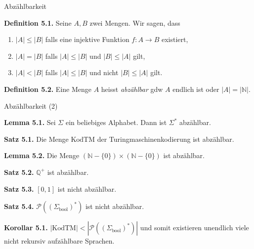 \documentclass[11pt,aspectratio=169]{beamer}
\begin{document}
\begin{frame}{Abzählbarkeit}

    \textbf{Definition 5.1.}
    Seine \(A, B\) zwei Mengen.
    Wir sagen, dass
    \begin{enumerate}
        \item \(|A| \le |B|\) falls eine injektive Funktion \(f : A \to B\) existiert,
        \item \(|A| = |B|\) falls \(|A| \le |B|\) und \(|B| \le |A|\) gilt,
        \item \(|A| < |B|\) falls \(|A| \le |B|\) und nicht \(|B| \le |A|\) gilt.
    \end{enumerate}

    \vspace{1em}

    \textbf{Definition 5.2.}
    Eine Menge \(A\) heisst \textit{abzählbar} gdw \(A\) endlich ist oder \(|A| = |\mathbb N|\).

\end{frame}

\begin{frame}{Abzählbarkeit (2)}

    \textbf{Lemma 5.1.}
    Sei \(\Sigma\) ein beliebiges Alphabet.
    Dann ist \(\Sigma^*\) abzählbar.

    \vspace{1em}

    \textbf{Satz 5.1.}
    Die Menge \(\text{KodTM}\) der Turingmaschinenkodierung ist abzählbar.

    \vspace{1em}

    \textbf{Lemma 5.2.}
    Die Menge \((\mathbb N - \{0\}) \times (\mathbb N - \{0\})\) ist abzählbar.

    \vspace{1em}

    \textbf{Satz 5.2.}
    \(\mathbb Q^+\) ist abzählbar.

    \vspace{1em}

    \textbf{Satz 5.3.}
    \([0, 1]\) ist nicht abzählbar.

    \vspace{1em}

    \textbf{Satz 5.4.}
    \(\mathcal P((\Sigma_{\text{bool}})^*)\) ist nicht abzählbar.

    \vspace{1em}

    \textbf{Korollar 5.1.}
    \(|\text{KodTM}| < |\mathcal P((\Sigma_{\text{bool}})^*)|\) und somit existieren unendlich
    viele nicht rekursiv aufzählbare Sprachen.

\end{frame}
\end{document}
